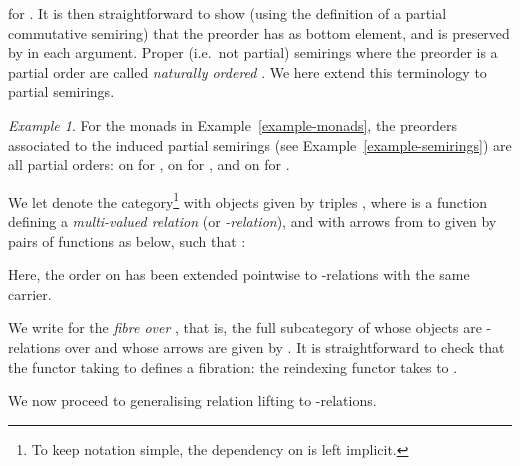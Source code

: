 \documentclass[submission,copyright,creativecommons]{eptcs}
\theoremstyle{plain}\newtheorem{theorem}{Theorem}[section]
\theoremstyle{remark}
\newtheorem{example}[remark]{Example}
\begin{document}
for . It is then straightforward to show (using the definition of a partial commutative semiring) that the preorder  has  as bottom element, and is preserved by  in each argument. Proper (i.e.~not partial) semirings where the preorder  is a partial order are called \emph{naturally ordered} \cite{EsikK07}. We here extend this terminology to partial semirings.

\begin{example}
\label{example-orders}
For the monads in Example~\ref{example-monads}, the preorders associated to the induced partial semirings (see Example~\ref{example-semirings}) are all partial orders:  on  for ,  on  for , and  on  for .
\end{example}

We let  denote the category\footnote{To keep notation simple, the dependency on  is left implicit.} with objects given by triples , where  is a function defining a \emph{multi-valued relation} (or \emph{-relation}), and with arrows from  to  given by pairs of functions  as below, such that :

Here, the order  on  has been extended pointwise to -relations with the same carrier.

We write  for the \emph{fibre over }, that is, the full subcategory of  whose objects are -relations over  and whose arrows are given by . It is straightforward to check that the functor  taking  to  defines a fibration: the reindexing functor  takes  to . 

We now proceed to generalising relation lifting to -relations.
\end{document}
